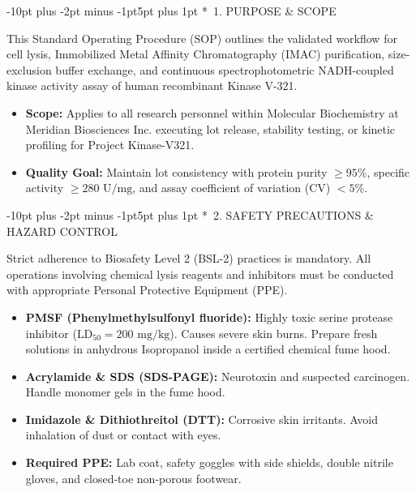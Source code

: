 \documentclass[10pt,a4paper]{article}
\makeatletter
\renewcommand\section{\@startsection{section}{1}{\z@}%
  {-10pt plus -2pt minus -1pt}{5pt plus 1pt}%
  {\normalfont\large\bfseries\color{SopNavy}}}
\makeatother
\begin{document}
\section*{\faInfoCircle\ 1. PURPOSE \& SCOPE}

This Standard Operating Procedure (SOP) outlines the validated workflow for cell lysis, Immobilized Metal Affinity Chromatography (IMAC) purification, size-exclusion buffer exchange, and continuous spectrophotometric NADH-coupled kinase activity assay of human recombinant Kinase V-321.

\begin{itemize}
  \item \textbf{Scope:} Applies to all research personnel within Molecular Biochemistry at Meridian Biosciences Inc. executing lot release, stability testing, or kinetic profiling for Project Kinase-V321.
  \item \textbf{Quality Goal:} Maintain lot consistency with protein purity $\ge 95\%$, specific activity $\ge 280\text{ U/mg}$, and assay coefficient of variation ($\text{CV}$) $< 5\%$.
\end{itemize}

\section*{\faBiohazard\ 2. SAFETY PRECAUTIONS \& HAZARD CONTROL}

\begin{tcolorbox}[hazardbox]
  \scriptsize
  Strict adherence to Biosafety Level 2 (BSL-2) practices is mandatory. All operations involving chemical lysis reagents and inhibitors must be conducted with appropriate Personal Protective Equipment (PPE).
  \begin{itemize}[leftmargin=10pt]
    \item \textbf{PMSF (Phenylmethylsulfonyl fluoride):} Highly toxic serine protease inhibitor ($\text{LD}_{50} = 200\text{ mg/kg}$). Causes severe skin burns. Prepare fresh solutions in anhydrous Isopropanol inside a certified chemical fume hood.
    \item \textbf{Acrylamide \& SDS (SDS-PAGE):} Neurotoxin and suspected carcinogen. Handle monomer gels in the fume hood.
    \item \textbf{Imidazole \& Dithiothreitol (DTT):} Corrosive skin irritants. Avoid inhalation of dust or contact with eyes.
    \item \textbf{Required PPE:} Lab coat, safety goggles with side shields, double nitrile gloves, and closed-toe non-porous footwear.
  \end{itemize}
\end{tcolorbox}
\end{document}

